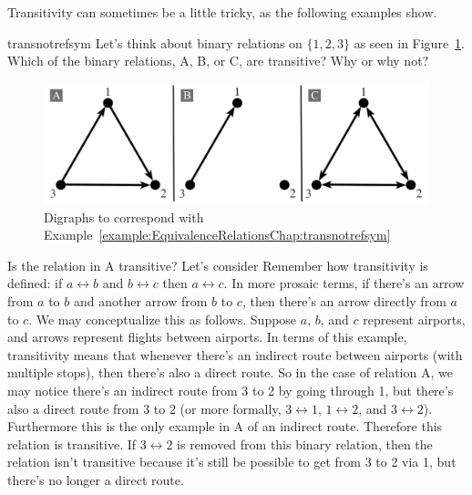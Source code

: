 Transitivity can sometimes be a little tricky, as the following examples show.

\begin{example}{transnotrefsym}
Let's think about binary relations on $\{1,2,3\}$ as seen in Figure~\ref{fig:transnotrefsym}. Which of the binary relations, A, B, or C, are transitive? Why or why not?

\begin{figure}[htpb]
\begin{center}
 \includegraphics[width=5.5in]{images/transnotrefsym.png}
\caption{Digraphs to correspond with Example~\ref{example:EquivalenceRelationsChap:transnotrefsym}\label{fig:transnotrefsym}}
\end{center}
\end{figure}

Is  the relation in A transitive? Let's consider Remember how transitivity is defined:  if $a \rel b$ and $b \rel c$ then  $a \rel c$. In more prosaic terms, if there's an arrow from $a$ to $b$ and another arrow from $b$ to $c$, then there's an arrow directly from $a$ to $c$. We may conceptualize this as follows. Suppose $a$, $b$, and $c$ represent airports, and arrows represent flights between airports.  In terms of this example, transitivity means that whenever there's an indirect route between airports (with multiple stops), then there's also a direct route. So in the case of relation A, we may notice there's an indirect route from 3 to 2 by going through 1, but there's also a direct route from 3 to 2 (or more formally, $3 \rel 1$, $1 \rel 2$, and $3 \rel 2$). Furthermore this is the only example in A of an indirect route. Therefore this relation is transitive. If $3 \rel 2$ is removed from this binary relation, then the relation isn't transitive because it's still be possible to get from 3 to 2 via 1, but there's no longer a direct route.


\end{example}
